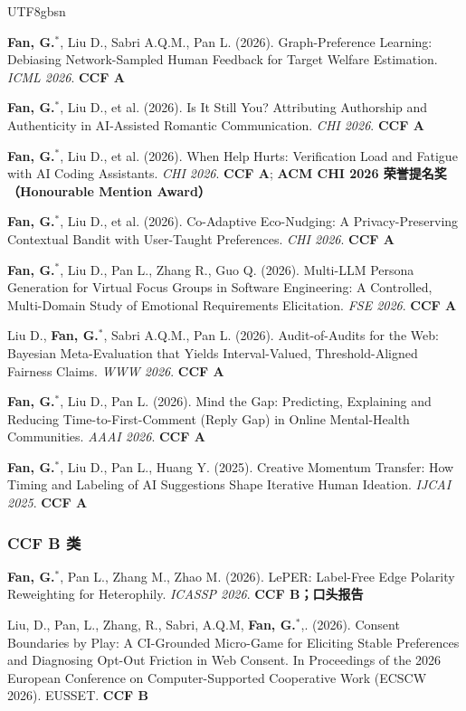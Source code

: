 \documentclass[a4paper,10pt]{article}
\newcommand{\pubitem}[1]{\item #1}
\begin{document}
\begin{CJK*}{UTF8}{gbsn}
\begin{enumerate}[label={[C\arabic*]}]
    \pubitem{\textbf{Fan, G.}$^*$, Liu D., Sabri A.Q.M., Pan L. (2026). Graph-Preference Learning: Debiasing Network-Sampled Human Feedback for Target Welfare Estimation. \textit{ICML 2026}. \textbf{CCF A}}
    
    \pubitem{\textbf{Fan, G.}$^*$, Liu D., et al. (2026). Is It Still You? Attributing Authorship and Authenticity in AI-Assisted Romantic Communication. \textit{CHI 2026}. \textbf{CCF A}}
    
    \pubitem{\textbf{Fan, G.}$^*$, Liu D., et al. (2026). When Help Hurts: Verification Load and Fatigue with AI Coding Assistants. \textit{CHI 2026}. \textbf{CCF A}; \textbf{ACM CHI 2026 荣誉提名奖（Honourable Mention Award）}}
    
    \pubitem{\textbf{Fan, G.}$^*$, Liu D., et al. (2026). Co-Adaptive Eco-Nudging: A Privacy-Preserving Contextual Bandit with User-Taught Preferences. \textit{CHI 2026}. \textbf{CCF A}}
    
    \pubitem{\textbf{Fan, G.}$^*$, Liu D., Pan L., Zhang R., Guo Q. (2026). Multi-LLM Persona Generation for Virtual Focus Groups in Software Engineering: A Controlled, Multi-Domain Study of Emotional Requirements Elicitation. \textit{FSE 2026}. \textbf{CCF A}}
    
    \pubitem{Liu D., \textbf{Fan, G.}$^*$, Sabri A.Q.M., Pan L. (2026). Audit-of-Audits for the Web: Bayesian Meta-Evaluation that Yields Interval-Valued, Threshold-Aligned Fairness Claims. \textit{WWW 2026}. \textbf{CCF A}}
    
    \pubitem{\textbf{Fan, G.}$^*$, Liu D., Pan L. (2026). Mind the Gap: Predicting, Explaining and Reducing Time-to-First-Comment (Reply Gap) in Online Mental-Health Communities. \textit{AAAI 2026}. \textbf{CCF A}}
    
    \pubitem{\textbf{Fan, G.}$^*$, Liu D., Pan L., Huang Y. (2025). Creative Momentum Transfer: How Timing and Labeling of AI Suggestions Shape Iterative Human Ideation. \textit{IJCAI 2025}. \textbf{CCF A}}
\end{enumerate}

\subsubsection*{CCF B 类}

\begin{enumerate}[label={[C\arabic*]}, resume]
    \pubitem{\textbf{Fan, G.}$^*$, Pan L., Zhang M., Zhao M. (2026). LePER: Label-Free Edge Polarity Reweighting for Heterophily. \textit{ICASSP 2026}. \textbf{CCF B；口头报告}}
    \pubitem{Liu, D., Pan, L., Zhang, R., Sabri, A.Q.M, \textbf{Fan, G.}$^*$,. (2026). Consent Boundaries by Play: A CI-Grounded Micro-Game for Eliciting Stable Preferences and Diagnosing Opt-Out Friction in Web Consent. In Proceedings of the 2026 European Conference on Computer-Supported Cooperative Work (ECSCW 2026). EUSSET. \textbf{CCF B}}
    


\end{enumerate}
\end{CJK*}
\end{document}
